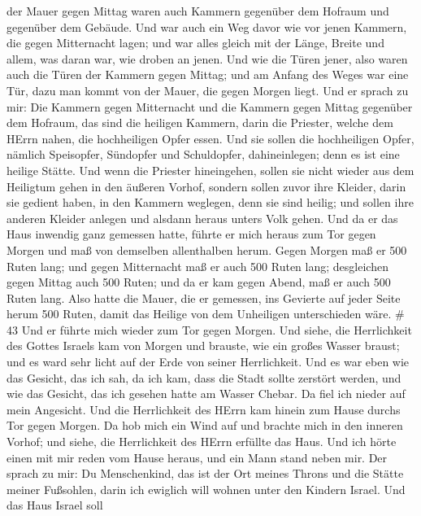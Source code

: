 der Mauer gegen Mittag waren auch Kammern gegenüber dem Hofraum und
gegenüber dem Gebäude.  Und war auch ein Weg davor wie vor
jenen Kammern, die gegen Mitternacht lagen; und war alles gleich mit der
Länge, Breite und allem, was daran war, wie droben an jenen.
 Und wie die Türen jener, also waren auch die Türen der
Kammern gegen Mittag; und am Anfang des Weges war eine Tür, dazu man
kommt von der Mauer, die gegen Morgen liegt.  Und er sprach
zu mir: Die Kammern gegen Mitternacht und die Kammern gegen Mittag
gegenüber dem Hofraum, das sind die heiligen Kammern, darin die
Priester, welche dem HErrn nahen, die hochheiligen Opfer essen. Und sie
sollen die hochheiligen Opfer, nämlich Speisopfer, Sündopfer und
Schuldopfer, dahineinlegen; denn es ist eine heilige Stätte.
 Und wenn die Priester hineingehen, sollen sie nicht wieder
aus dem Heiligtum gehen in den äußeren Vorhof, sondern sollen zuvor ihre
Kleider, darin sie gedient haben, in den Kammern weglegen, denn sie sind
heilig; und sollen ihre anderen Kleider anlegen und alsdann heraus
unters Volk gehen.  Und da er das Haus inwendig ganz
gemessen hatte, führte er mich heraus zum Tor gegen Morgen und maß von
demselben allenthalben herum.  Gegen Morgen maß er 500
Ruten lang;  und gegen Mitternacht maß er auch 500 Ruten
lang;  desgleichen gegen Mittag auch 500 Ruten;
 und da er kam gegen Abend, maß er auch 500 Ruten lang.
 Also hatte die Mauer, die er gemessen, ins Gevierte auf
jeder Seite herum 500 Ruten, damit das Heilige von dem Unheiligen
unterschieden wäre. \# 43  Und er führte mich wieder zum Tor
gegen Morgen.  Und siehe, die Herrlichkeit des Gottes
Israels kam von Morgen und brauste, wie ein großes Wasser braust; und es
ward sehr licht auf der Erde von seiner Herrlichkeit.  Und
es war eben wie das Gesicht, das ich sah, da ich kam, dass die Stadt
sollte zerstört werden, und wie das Gesicht, das ich gesehen hatte am
Wasser Chebar. Da fiel ich nieder auf mein Angesicht.  Und
die Herrlichkeit des HErrn kam hinein zum Hause durchs Tor gegen Morgen.
 Da hob mich ein Wind auf und brachte mich in den inneren
Vorhof; und siehe, die Herrlichkeit des HErrn erfüllte das Haus.
 Und ich hörte einen mit mir reden vom Hause heraus, und ein
Mann stand neben mir.  Der sprach zu mir: Du Menschenkind,
das ist der Ort meines Throns und die Stätte meiner Fußsohlen, darin ich
ewiglich will wohnen unter den Kindern Israel. Und das Haus Israel soll
